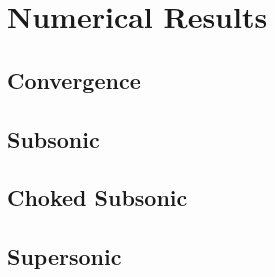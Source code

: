 \documentclass{article}%
\numberwithin{equation}{section}
\begin{document}
\section{Numerical Results}

\subsection{Convergence}

\subsection{Subsonic}

\subsection{Choked Subsonic}

\subsection{Supersonic}
\end{document}

